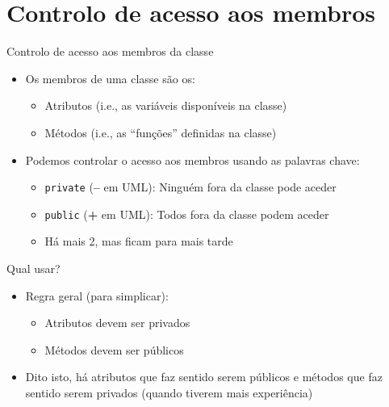\documentclass[portuguese, aspectratio=169, xcolor=table]{beamer}
\begin{document}
\section{Controlo de acesso aos membros}
\begin{frame}{Controlo de acesso aos membros da classe}
\begin{itemize}
    \item Os membros de uma classe são os:
    \begin{itemize}
        \item Atributos (i.e., as variáveis disponíveis na classe)
        \item Métodos (i.e., as ``funções'' definidas na classe)
    \end{itemize}
    \item Podemos controlar o acesso aos membros usando as palavras chave:
    \begin{itemize}
        \item \texttt{private} (\textbf{--} em UML): Ninguém fora da classe pode aceder
        \item \texttt{public}  (\textbf{+} em UML): Todos fora da classe podem aceder
        \item Há mais 2, mas ficam para mais tarde
    \end{itemize}
\end{itemize}
\vfill

\begin{block}{Qual usar?}
\begin{itemize}
    \item Regra geral (para simplicar):
    \begin{itemize}
        \item Atributos devem ser privados
        \item Métodos devem ser públicos
    \end{itemize}
    \item Dito isto, há atributos que faz sentido serem públicos e métodos que faz sentido serem privados (quando tiverem mais experiência)
\end{itemize}
\end{block}
\end{frame}
\end{document}
